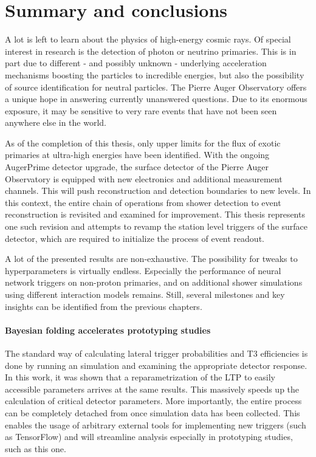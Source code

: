 
\chapter{Summary and conclusions}
\label{chap:summary-and-conclusions}

A lot is left to learn about the physics of high-energy cosmic rays. Of special interest in research is the detection of photon or neutrino primaries. This is in 
part due to different - and possibly unknown - underlying acceleration mechanisms boosting the particles to incredible energies, but also the possibility of 
source identification for neutral particles. The Pierre Auger Observatory offers a unique hope in answering currently unanswered questions. Due to its enormous 
exposure, it may be sensitive to very rare events that have not been seen anywhere else in the world. 

As of the completion of this thesis, only upper limits for the flux of exotic primaries at ultra-high energies have been identified. With the ongoing AugerPrime 
detector upgrade, the surface detector of the Pierre Auger Observatory is equipped with new electronics and additional measurement channels. This will push 
reconstruction and detection boundaries to new levels. In this context, the entire chain of operations from shower detection to event reconstruction is revisited 
and examined for improvement. This thesis represents one such revision and attempts to revamp the station level triggers of the surface detector, which are 
required to initialize the process of event readout. 

A lot of the presented results are non-exhaustive. The possibility for tweaks to hyperparameters is virtually endless. Especially the performance of neural network
triggers on non-proton primaries, and on additional shower simulations using different interaction models remains. Still, several milestones and key insights can 
be identified from the previous chapters.

\subsubsection{Bayesian folding accelerates prototyping studies}

The standard way of calculating lateral trigger probabilities and T3 efficiencies is done by running an \Offline simulation and examining the appropriate detector 
response. In this work, it was shown that a reparametrization of the LTP to easily accessible parameters arrives at the same results. This massively speeds up 
the calculation of critical detector parameters. More importantly, the entire process can be completely detached from \Offline once simulation data has been 
collected. This enables the usage of arbitrary external tools for implementing new triggers (such as TensorFlow) and will streamline analysis especially in 
prototyping studies, such as this one. 

